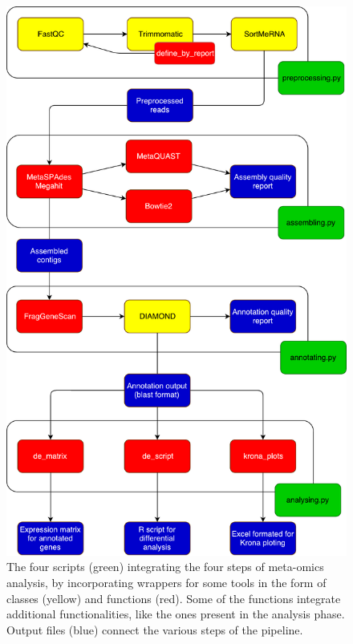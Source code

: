 \documentclass[
  oneside,
  11pt, a4paper,
  footinclude=true,
  headinclude=true,
  cleardoublepage=empty
]{scrbook}
\begin{document}
    \begin{figure}[ph!]
    \includegraphics[width=\columnwidth,height=\textheight]{FiguresUndTables/Development/mosca_classes.pdf}
    \caption{The four scripts (green) integrating the four steps of meta-omics analysis, by incorporating wrappers for some tools in the form of classes (yellow) and functions (red). Some of the functions integrate additional functionalities, like the ones present in the analysis phase. Output files (blue) connect the various steps of the pipeline.}
    \label{fig:moscaclasses}
    \end{figure}
    
\end{document}
